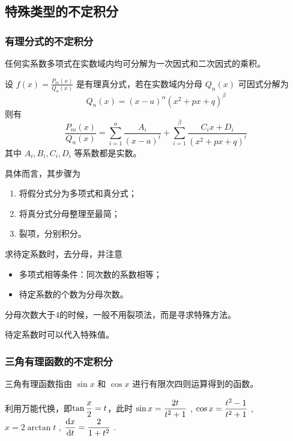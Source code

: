 \subsection{特殊类型的不定积分}

\subsubsection{有理分式的不定积分}

\begin{Theo}[]

    任何实系数多项式在实数域内均可分解为一次因式和二次因式的乘积。
\end{Theo}

\begin{Theo}[]

    设 $ f(x)=\frac{P_m(x)}{Q_n(x)}$ 是有理真分式，若在实数域内分母 $ Q_n(x) $ 可因式分解为 $$
        Q_n(x)=(x-a)^\alpha(x^2+px+q)^\beta
    $$ 
    则有$$
        \frac{P_m(x)}{Q_n(x)}=\sum_{i=1}^\alpha \frac{A_i}{(x-a)^i}+
        \sum_{i=1}^\beta \frac{C_ix+D_i}{(x^2+px+q)^i}
    $$ 其中 $ A_i,B_i,C_i,D_i $ 等系数都是实数。
\end{Theo}

具体而言，其步骤为
\begin{enumerate}
    \item 将假分式分为多项式和真分式；
    \item 将真分式分母整理至最简；
    \item 裂项，分别积分。
\end{enumerate}

求待定系数时，去分母，并注意\begin{itemize}
    \item 多项式相等条件：同次数的系数相等；
    \item 待定系数的个数为分母次数。
\end{itemize}

分母次数大于4的时候，一般不用裂项法，而是寻求特殊方法。

待定系数时可以代入特殊值。

\subsubsection{三角有理函数的不定积分}

三角有理函数指由 $ \sin x $ 和 $ \cos x $ 进行有限次四则运算得到的函数。

\begin{Field}[三角有理函数的不定积分一般方法]

    利用万能代换，即$\tan \displaystyle\frac{x}{2} = t $，此时 $ \sin x = \displaystyle\frac{2t}{t^2+1} $ ,
    $ \cos x = \displaystyle\frac{t^2-1}{t^2+1} $ , $ x = 2\arctan t $ ,
    $ \displaystyle\frac{\mathrm{d}x}{\mathrm{d}t} = \displaystyle\frac{2}{1+t^2} $ .
\end{Field}

